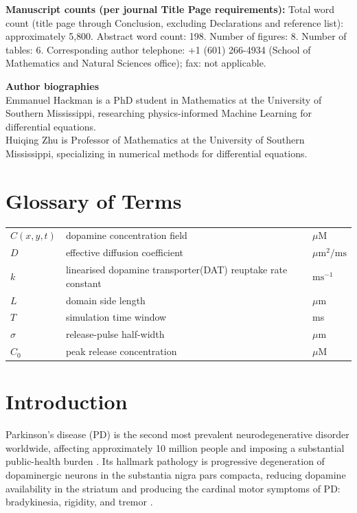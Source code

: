 \documentclass[pdflatex,sn-basic,Numbered]{sn-jnl}
\theoremstyle{thmstyleone}
\theoremstyle{thmstyletwo}
\begin{document}
\noindent\textbf{Manuscript counts (per journal Title Page
requirements):} Total word count (title page through Conclusion,
excluding Declarations and reference list): approximately
5{,}800. Abstract word count: 198. Number of figures: 8. Number
of tables: 6. Corresponding author telephone: +1 (601) 266-4934
(School of Mathematics and Natural Sciences office); fax: not
applicable.

\noindent\textbf{Author biographies} \\[0.5em]
Emmanuel Hackman is a PhD student in Mathematics at the
University of Southern Mississippi, researching physics-informed
Machine Learning for differential equations. \\[0.5em]
Huiqing Zhu is Professor of Mathematics at the University of
Southern Mississippi,
specializing in numerical methods for differential equations.

\section*{Glossary of Terms}
\label{sec:glossary}

\begin{tabular}{@{}lll@{}}
$C(x,y,t)$ & dopamine concentration field & $\mu$M \\
$D$        & effective diffusion coefficient & $\mu\text{m}^2/\text{ms}$ \\
$k$        & linearised dopamine transporter(DAT) reuptake rate constant & $\text{ms}^{-1}$ \\
$L$        & domain side length & $\mu$m \\
$T$        & simulation time window & ms \\
$\sigma$   & release-pulse half-width & $\mu$m \\
$C_0$      & peak release concentration & $\mu$M \\
\end{tabular}

\section{Introduction}
\label{sec:intro}

Parkinson's disease (PD) is the second most prevalent
neurodegenerative disorder worldwide, affecting approximately
10 million people and imposing a substantial public-health
burden \cite{GBD2016}. Its hallmark pathology is progressive
degeneration of dopaminergic neurons in the substantia nigra
pars compacta, reducing dopamine availability in the striatum
and producing the cardinal motor symptoms of PD: bradykinesia,
rigidity, and tremor \cite{Hornykiewicz1966, DeLong2007}.
\end{document}
